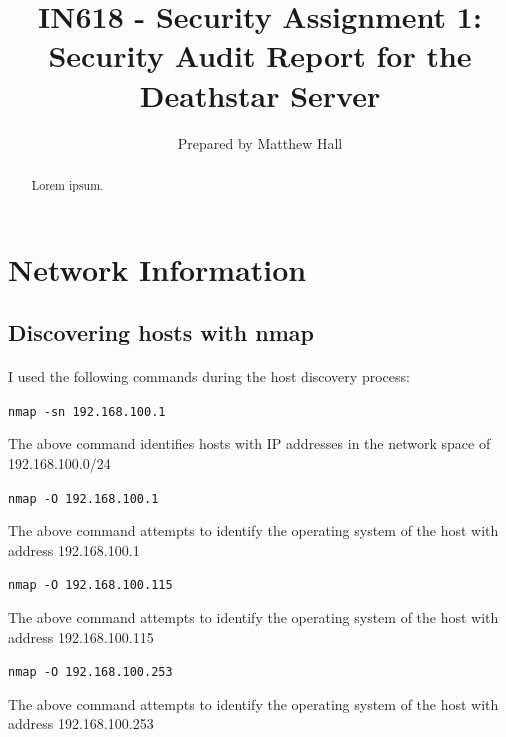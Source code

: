 \documentclass{article}
\title{IN618 - Security Assignment 1: Security Audit Report for the Deathstar Server}
\author{Prepared by Matthew Hall}
\date{}
\begin{document}
\maketitle
\renewcommand{\abstractname}{Executive Summary}
\begin{abstract}
Lorem ipsum.
\end{abstract}
\newpage
{}

\tableofcontents
\newpage

\section{Network Information}
\label{sec:network_information}

\subsection{Discovering hosts with nmap}
\label{subsec:discovering_hosts}
\paragraph{}
I used the following commands during the host discovery process:

\texttt{nmap -sn 192.168.100.1}

The above command identifies hosts with IP addresses in the network space of 192.168.100.0/24

\texttt{nmap -O 192.168.100.1}

The above command attempts to identify the operating system of the host with address 192.168.100.1

\texttt{nmap -O 192.168.100.115}

The above command attempts to identify the operating system of the host with address 192.168.100.115

\texttt{nmap -O 192.168.100.253}

The above command attempts to identify the operating system of the host with address 192.168.100.253
\end{document}
